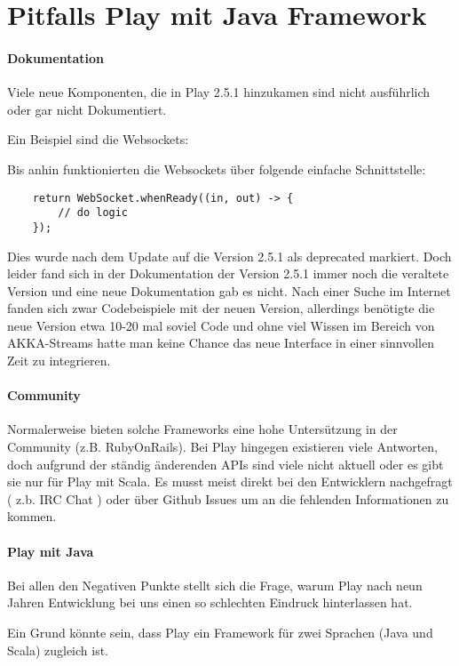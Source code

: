 \chapter{Pitfalls Play mit Java Framework}
\label{ch:play_pitfalls}

\subsubsection{Dokumentation}

Viele neue Komponenten, die in Play 2.5.1 hinzukamen sind nicht ausführlich oder gar nicht Dokumentiert.

Ein Beispiel sind die Websockets:

Bis anhin funktionierten die Websockets über folgende einfache Schnittstelle:
\begin{lstlisting}
    return WebSocket.whenReady((in, out) -> {
        // do logic
    });
\end{lstlisting}

Dies wurde nach dem Update auf die Version 2.5.1 als deprecated markiert. Doch leider fand sich in der Dokumentation der Version 2.5.1 immer noch die veraltete Version und eine neue Dokumentation gab es nicht. Nach einer Suche im Internet fanden sich zwar Codebeispiele mit der neuen Version, allerdings benötigte die neue Version etwa 10-20 mal soviel Code und ohne viel Wissen im Bereich von AKKA-Streams hatte man keine Chance das neue Interface in einer sinnvollen Zeit zu integrieren.

\subsubsection{Community}
Normalerweise bieten solche Frameworks eine hohe Untersützung in der Community (z.B. RubyOnRails). Bei Play hingegen existieren viele Antworten, doch aufgrund der ständig änderenden APIs sind viele nicht aktuell oder es gibt sie nur für Play mit Scala. 
Es musst meist direkt bei den Entwicklern nachgefragt ( z.b. IRC Chat ) oder über Github Issues \cite{github-ticket} um an die fehlenden Informationen zu kommen.


\subsubsection{Play mit Java}
Bei allen den Negativen Punkte stellt sich die Frage, warum Play nach neun Jahren Entwicklung bei uns einen so schlechten Eindruck hinterlassen hat. 

Ein Grund könnte sein, dass Play ein Framework für zwei Sprachen (Java und Scala) zugleich ist. 